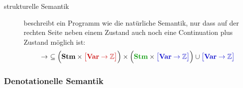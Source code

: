 \documentclass[
  a4paper,
  11pt,
]{scrartcl}
\newcommand{\Z}{\mathbb{Z}}
\begin{document}
\begin{itemize}
\begin{description}
      \item[strukturelle Semantik] beschreibt ein Programm wie die natürliche
        Semantik, nur dass auf der rechten Seite neben einem
        \textcolor{myblue}{Zustand} auch noch eine
        \textcolor{mygreen}{Continuation} plus \textcolor{myblue}{Zustand}
        möglich ist:
        \begin{align*}
          \rightarrow \ \subseteq
          \Big(
          \textbf{Stm}
          \times
          \textcolor{myred}{\big[ \textbf{Var} \rightarrow \Z \big]}
          \Big)
          \times
          \Big(
          \textcolor{mygreen}{\textbf{Stm}}
          \times
          \textcolor{myblue}{\big[ \textbf{Var} \rightarrow \Z \big]}
          \Big)
          \cup
          \textcolor{myblue}{\big[ \textbf{Var} \rightarrow \Z \big]}
        \end{align*}
    \end{description}
\end{itemize}

\subsubsection{Denotationelle Semantik}
\label{ssub:denotationelle_semantik}
\end{document}
